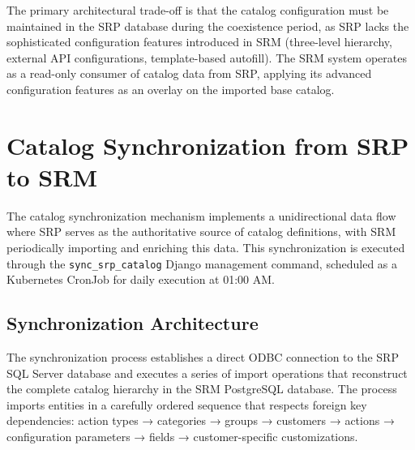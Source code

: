 The primary architectural trade-off is that the catalog configuration must be maintained in the SRP database during the coexistence period, as SRP lacks the sophisticated configuration features introduced in SRM (three-level hierarchy, external API configurations, template-based autofill). The SRM system operates as a read-only consumer of catalog data from SRP, applying its advanced configuration features as an overlay on the imported base catalog.

\section{Catalog Synchronization from SRP to SRM}

The catalog synchronization mechanism implements a unidirectional data flow where SRP serves as the authoritative source of catalog definitions, with SRM periodically importing and enriching this data. This synchronization is executed through the \texttt{sync\_srp\_catalog} Django management command, scheduled as a Kubernetes CronJob for daily execution at 01:00 AM.


\subsection{Synchronization Architecture}

The synchronization process establishes a direct ODBC connection to the SRP SQL Server database and executes a series of import operations that reconstruct the complete catalog hierarchy in the SRM PostgreSQL database. The process imports entities in a carefully ordered sequence that respects foreign key dependencies: action types → categories → groups → customers → actions → configuration parameters → fields → customer-specific customizations.


